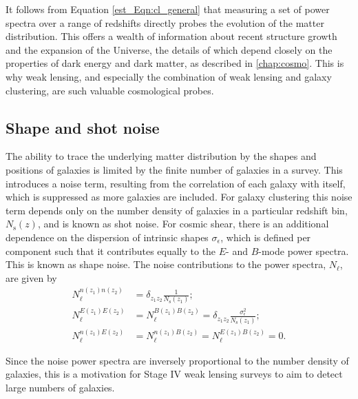 It follows from Equation \eqref{est_Eqn:cl_general} that measuring a set of \ttp{} power spectra over a range of redshifts directly probes the evolution of the matter distribution. This offers a wealth of information about recent structure growth and the expansion of the Universe, the details of which depend closely on the properties of dark energy and dark matter, as described in \autoref{chap:cosmo}. This is why weak lensing, and especially the combination of weak lensing and galaxy clustering, are such valuable cosmological probes.

\subsection{Shape and shot noise}
\label{est_Sec:noise}

The ability to trace the underlying matter distribution by the shapes and positions of galaxies is limited by the finite number of galaxies in a survey. This introduces a noise term, resulting from the correlation of each galaxy with itself, which is suppressed as more galaxies are included. For galaxy clustering this noise term depends only on the number density of galaxies in a particular redshift bin, $N_\text{s} \left( z \right)$, and is known as shot noise. For cosmic shear, there is an additional dependence on the dispersion of intrinsic shapes $\sigma_\epsilon$, which is defined per component such that it contributes equally to the $E$- and $B$-mode power spectra. This is known as shape noise. The noise contributions to the power spectra, $N_\ell$, are given by
\begin{align}
N_\ell^{n \left( z_1 \right) n \left( z_2 \right) } &=
\delta_{z_1 z_2} \frac{1}{N_\text{s} \left( z_1 \right)};
\\[1em]
N_\ell^{E \left( z_1 \right) E \left( z_2 \right) } &=
N_\ell^{B \left( z_1 \right) B \left( z_2 \right) } =
\delta_{z_1 z_2} \frac{\sigma_\epsilon^2}{N_\text{s} \left( z_1 \right)};
\\[1em]
N_\ell^{n \left( z_1 \right) E \left( z_2 \right) } &=
N_\ell^{n \left( z_1 \right) B \left( z_2 \right) } =
N_\ell^{E \left( z_1 \right) B \left( z_2 \right) } = 0.
\end{align}

Since the noise power spectra are inversely proportional to the number density of galaxies, this is a motivation for Stage IV weak lensing surveys to aim to detect large numbers of galaxies.


